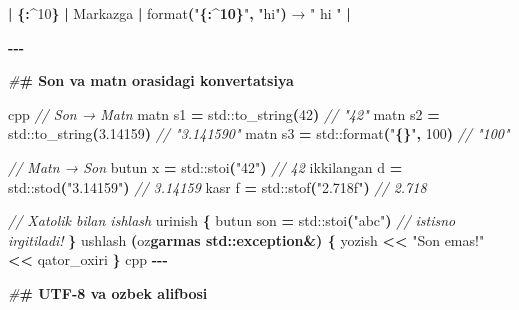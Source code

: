 \documentclass[a4paper,11pt,twoside,openright]{book}
\newenvironment{Shaded}{\begin{snugshade}}{\end{snugshade}}
\newcommand{\BuiltInTok}[1]{#1}
\newcommand{\CharTok}[1]{\textcolor[rgb]{0.31,0.60,0.02}{#1}}
\newcommand{\CommentTok}[1]{\textcolor[rgb]{0.56,0.35,0.01}{\textit{#1}}}
\newcommand{\DecValTok}[1]{\textcolor[rgb]{0.00,0.00,0.81}{#1}}
\newcommand{\ErrorTok}[1]{\textcolor[rgb]{0.64,0.00,0.00}{\textbf{#1}}}
\newcommand{\FloatTok}[1]{\textcolor[rgb]{0.00,0.00,0.81}{#1}}
\newcommand{\NormalTok}[1]{#1}
\newcommand{\OperatorTok}[1]{\textcolor[rgb]{0.81,0.36,0.00}{\textbf{#1}}}
\newcommand{\PreprocessorTok}[1]{\textcolor[rgb]{0.56,0.35,0.01}{\textit{#1}}}
\newcommand{\SpecialCharTok}[1]{\textcolor[rgb]{0.81,0.36,0.00}{\textbf{#1}}}
\newcommand{\StringTok}[1]{\textcolor[rgb]{0.31,0.60,0.02}{#1}}
\begin{document}
\begin{Shaded}
\begin{Highlighting}[]
\OperatorTok{|} \ErrorTok{\textasciigrave{}}\OperatorTok{\{:\^{}}\DecValTok{10}\OperatorTok{\}}\ErrorTok{\textasciigrave{}} \OperatorTok{|}\NormalTok{ Markazga }\OperatorTok{|} \ErrorTok{\textasciigrave{}}\NormalTok{format}\OperatorTok{(}\StringTok{"}\SpecialCharTok{\{:\^{}10\}}\StringTok{"}\OperatorTok{,} \StringTok{"hi"}\OperatorTok{)}\ErrorTok{\textasciigrave{}}\NormalTok{ → }\ErrorTok{\textasciigrave{}}\StringTok{"    hi    "}\ErrorTok{\textasciigrave{}} \OperatorTok{|}

\OperatorTok{{-}{-}{-}}

\PreprocessorTok{\#}\ErrorTok{\# Son va matn orasidagi konvertatsiya}

\ErrorTok{\textasciigrave{}\textasciigrave{}\textasciigrave{}}\NormalTok{cpp}
\CommentTok{// Son → Matn}
\NormalTok{matn s1 }\OperatorTok{=} \BuiltInTok{std::}\NormalTok{to\_string}\OperatorTok{(}\DecValTok{42}\OperatorTok{)}           \CommentTok{// "42"}
\NormalTok{matn s2 }\OperatorTok{=} \BuiltInTok{std::}\NormalTok{to\_string}\OperatorTok{(}\FloatTok{3.14159}\OperatorTok{)}      \CommentTok{// "3.141590"}
\NormalTok{matn s3 }\OperatorTok{=} \BuiltInTok{std::}\NormalTok{format}\OperatorTok{(}\StringTok{"}\SpecialCharTok{\{\}}\StringTok{"}\OperatorTok{,} \DecValTok{100}\OperatorTok{)}       \CommentTok{// "100"}

\CommentTok{// Matn → Son}
\NormalTok{butun x }\OperatorTok{=} \BuiltInTok{std::}\NormalTok{stoi}\OperatorTok{(}\StringTok{"42"}\OperatorTok{)}              \CommentTok{// 42}
\NormalTok{ikkilangan d }\OperatorTok{=} \BuiltInTok{std::}\NormalTok{stod}\OperatorTok{(}\StringTok{"3.14159"}\OperatorTok{)}    \CommentTok{// 3.14159}
\NormalTok{kasr f }\OperatorTok{=} \BuiltInTok{std::}\NormalTok{stof}\OperatorTok{(}\StringTok{"2.718f"}\OperatorTok{)}           \CommentTok{// 2.718}

\CommentTok{// Xatolik bilan ishlash}
\NormalTok{urinish }\OperatorTok{\{}
\NormalTok{    butun son }\OperatorTok{=} \BuiltInTok{std::}\NormalTok{stoi}\OperatorTok{(}\StringTok{"abc"}\OperatorTok{)}       \CommentTok{// istisno irgitiladi!}
\OperatorTok{\}}\NormalTok{ ushlash }\OperatorTok{(}\NormalTok{o}\CharTok{\textquotesingle{}z}\ErrorTok{garmas std::exception\&) \{}
\NormalTok{    yozish }\OperatorTok{\textless{}\textless{}} \StringTok{"Son emas!"} \OperatorTok{\textless{}\textless{}}\NormalTok{ qator\_oxiri}
\OperatorTok{\}}
\ErrorTok{\textasciigrave{}\textasciigrave{}\textasciigrave{}}\NormalTok{cpp}
\OperatorTok{{-}{-}{-}}

\PreprocessorTok{\#}\ErrorTok{\# UTF{-}8 va o\textquotesingle{}zbek alifbosi}


\end{Highlighting}
\end{Shaded}
\end{document}
